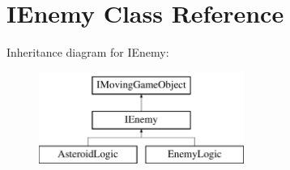 \hypertarget{class_i_enemy}{}\section{I\+Enemy Class Reference}
\label{class_i_enemy}
Inheritance diagram for I\+Enemy\+:\begin{figure}[H]
\begin{center}
\leavevmode
\includegraphics[height=3.000000cm]{class_i_enemy}
\end{center}
\end{figure}
